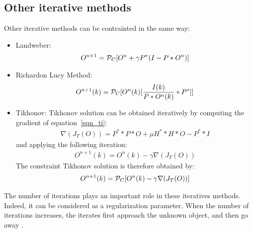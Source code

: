\documentclass[11pt,a4paper]{article}
\begin{document}
\subsection{Other iterative methods}
Other iterative methods can be contrainted in the same way:
\begin{itemize}
\item{Landweber:}
\begin{eqnarray}
O^{n+1} = {\cal P}_C [ O^{n} + \gamma P^* (I - P *  O^n) ]
\end{eqnarray}
\item{Richardon Lucy Method:}
\begin{eqnarray}
O^{n+1}(k) = {\cal P}_C [ O^{n}(k) [{I(k) \over P* O^{n}(k)}*P^*] ]
\end{eqnarray}
\item{Tikhonov:}  Tikhonov solution can be obtained iteratively 
by computing  the gradient of equation~\ref{eqn_ti}:
\begin{eqnarray}
 \nabla(J_T(O)) = P^* * P * O + \mu H^* * H * O - P^* * I
\end{eqnarray}
and applying the following iteration:
\begin{eqnarray}
O^{n+1}(k) = O^{n}(k) - \gamma \nabla(J_T(O))
\end{eqnarray}
The constraint Tikhonov solution is therefore obtained by:
\begin{eqnarray}
O^{n+1}(k) =  {\cal P}_C [ O^{n}(k) - \gamma \nabla(J_T(O)) ]
\end{eqnarray}
\end{itemize}

The number of iterations plays an important role in these iteratives
methods. Indeed, it can be considered as a regularization parameter.
When the number of iterations increases, the iterates first approach
the unknown object, and then go away \cite{ima:bertero98}. 



\end{document}
